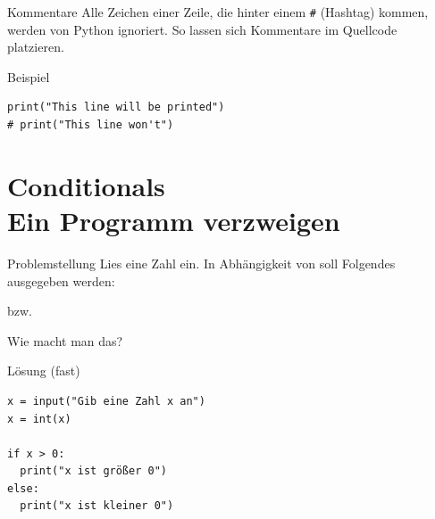 \begin{fragile}


\begin{block}{Kommentare}
\vspace{2pt}
Alle Zeichen einer Zeile, die hinter einem \texttt{\#} (Hashtag) kommen, werden von Python ignoriert.
So lassen sich Kommentare im Quellcode platzieren. 
\end{block}

\vspace{12pt}

\pause
\begin{exampleblock}{Beispiel}
\begin{verbatim}
print("This line will be printed")
# print("This line won't") 
\end{verbatim}
\end{exampleblock}

\end{fragile}



\section{Conditionals \\ \footnotesize Ein Programm verzweigen}

\begin{frame}
	\begin{block}{Problemstellung}
		\vspace{2pt}
		Lies eine Zahl  ein. In Abhängigkeit von  soll Folgendes ausgegeben werden: 
		
		
		bzw. 
		
		\vspace{8pt}
		
		
		Wie macht man das?
		\end{block}
\end{frame}

\begin{fragile}
	
\begin{block}{Lösung \footnotesize(fast)}
\begin{verbatim}
x = input("Gib eine Zahl x an")
x = int(x)

if x > 0:
  print("x ist größer 0")
else:
  print("x ist kleiner 0")
\end{verbatim}
\end{block}
	
\end{fragile}


